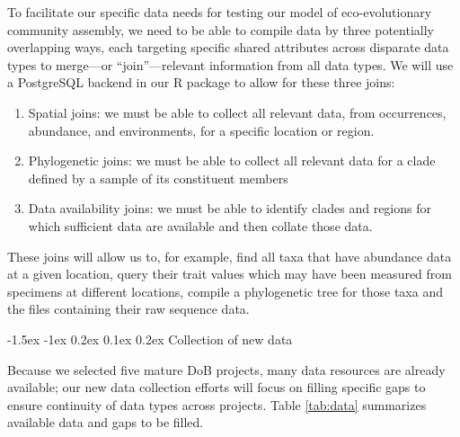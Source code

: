 \documentclass[11pt]{article}
\makeatletter
\renewcommand\subsubsection{\@startsection{subsection}{1}{\z@}%
                                  {-1.5ex \@plus -1ex \@minus 0.2ex}%
                                  {0.1ex \@plus 0.2ex}%
                                  {\normalfont\bfseries}}
\makeatother
\begin{document}
To facilitate our specific data needs for testing our model of
eco-evolutionary community assembly, we need to be able to compile data
by three potentially overlapping ways, each targeting specific shared
attributes across disparate data types to merge---or ``join''---relevant
information from all data types. We will use a PostgreSQL
\cite{Douglas2003-zs} backend in our R package to allow for these three
joins:

\begin{enumerate}
\def\labelenumi{\arabic{enumi}.}
\item
  Spatial joins: we must be able to collect all relevant data, from
  occurrences, abundance, and environments, for a specific location or
  region.
\item
  Phylogenetic joins: we must be able to collect all relevant data for a
  clade defined by a sample of its constituent members
\item
  Data availability joins: we must be able to identify clades and
  regions for which sufficient data are available and then collate those
  data.
\end{enumerate}

These joins will allow us to, for example, find all taxa that have
abundance data at a given location, query their trait values which may
have been measured from specimens at different locations, compile a
phylogenetic tree for those taxa and the files containing their raw
sequence data.

\subsubsection{Collection of new data} \label{collection-of-new-data}

Because we selected five mature DoB projects, many data resources are
already available; our new data collection efforts will focus on filling
specific gaps to ensure continuity of data types across projects. Table
\ref{tab:data} summarizes available data and gaps to be filled.
\end{document}
